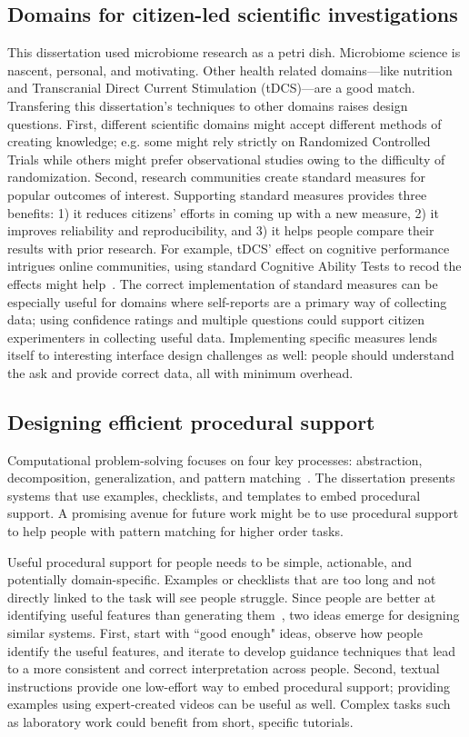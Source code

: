 \subsection{Domains for citizen-led scientific investigations}
This dissertation used microbiome research as a petri dish. Microbiome science is nascent, personal, and motivating. Other health related domains---like nutrition and Transcranial Direct Current Stimulation (tDCS)---are a good match. Transfering this dissertation's techniques to other domains raises design questions. First, different scientific domains might accept different methods of creating knowledge; e.g. some might rely strictly on Randomized Controlled Trials while others might prefer observational studies owing to the difficulty of randomization. Second, research communities create standard measures for popular outcomes of interest. Supporting standard measures provides three benefits: 1) it reduces citizens' efforts in coming up with a new measure, 2) it improves reliability and reproducibility, and 3) it helps people compare their results with prior research. For example, tDCS' effect on cognitive performance intrigues online communities, using standard Cognitive Ability Tests to recod the effects might help~\cite{macan1994effects}. The correct implementation of standard measures can be especially useful for domains where self-reports are a primary way of collecting data; using confidence ratings and multiple questions could support citizen experimenters in collecting useful data. Implementing specific measures lends itself to interesting interface design challenges as well: people should understand the ask and provide correct data, all with minimum overhead.

\subsection{Designing efficient procedural support}
Computational problem-solving focuses on four key processes: abstraction, decomposition, generalization, and pattern matching~\cite{Wing2006}. The dissertation presents systems that use examples, checklists, and templates to embed procedural support. A promising avenue for future work might be to use procedural support to help people with pattern matching for higher order tasks.

Useful procedural support for people needs to be simple, actionable, and potentially domain-specific. Examples or checklists that are too long and not directly linked to the task will see people struggle. Since people are better at identifying useful features than generating them~\cite{Stahl2006}, two ideas emerge for designing similar systems. First, start with ``good enough" ideas, observe how people identify the useful features, and iterate to develop guidance techniques that lead to a more consistent and correct interpretation across people. Second, textual instructions provide one low-effort way to embed procedural support; providing examples using expert-created videos can be useful as well. Complex tasks such as laboratory work could benefit from short, specific tutorials.

